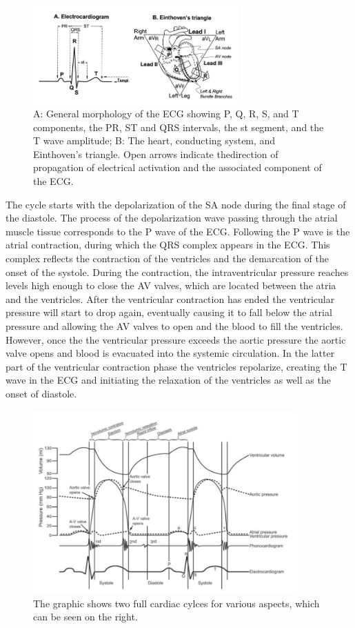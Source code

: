 \begin{figure}[ht]
\centering
\includegraphics[width=0.7\textwidth]{images/ecg.png}
\caption{A: General morphology of the ECG showing P, Q, R, S, and T components, the PR, ST and QRS intervals, the st segment, and the T wave amplitude; B: The heart, conducting system, and Einthoven's triangle. Open arrows indicate thedirection of propagation of electrical activation and the associated component of the ECG.\citep{HANDBOOKPP}}
\label{ecgImg}
\end{figure}

The cycle starts with the depolarization of the SA node during the final stage of the diastole. The process of the depolarization wave passing through the atrial muscle tissue corresponds to the P wave of the ECG. Following the P wave is the atrial contraction, during which the QRS complex appears in the ECG. This complex reflects the contraction of the ventricles and the demarcation of the onset of the systole. During the contraction, the intraventricular pressure reaches levels high enough to close the AV valves, which are located between the atria and the ventricles. After the ventricular contraction has ended the ventricular pressure will start to drop again, eventually causing it to fall below the atrial pressure and allowing the AV valves to open and the blood to fill the ventricles. However, once the the ventricular pressure exceeds the aortic pressure the aortic valve opens and blood is evacuated into the systemic circulation. In the latter part of the ventricular contraction phase the ventricles repolarize, creating the T wave in the ECG and initiating the relaxation of the ventricles as well as the onset of diastole. 

\begin{figure}[ht]
\centering
\includegraphics[width=0.9\textwidth]{images/cycleImg.png}
\caption{The graphic shows two full cardiac cylces for various aspects, which can be seen on the right.\citep{HANDBOOKPP}}
\label{cycleImg}
\end{figure}

